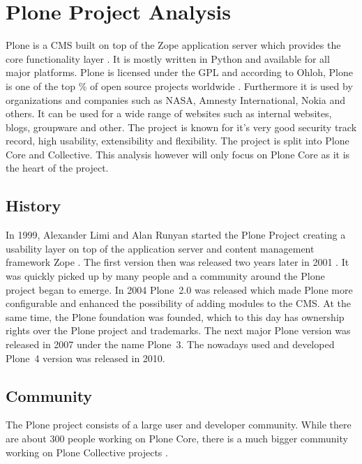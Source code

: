 \section{Plone Project Analysis} %


Plone is a \ac{CMS} built on top of the Zope application server which provides
the core functionality layer \cite{Aspeli2005,PloneFaq,PloneWhatIsPlone}. It is
mostly written in Python and available for all major platforms. Plone is
licensed under the \ac{GPL} and according to Ohloh, Plone is one of the top
\unit[2]{\%} of open source projects worldwide \cite{PloneOhlohFactoids}.
Furthermore it is used by organizations and companies such as NASA, Amnesty
International, Nokia and others. It can be used for a wide range of websites such
as internal websites, blogs, groupware and other. The project is known for it's
very good security track record, high usability, extensibility and flexibility.
The project is split into Plone Core and Collective. This analysis however will
only focus on Plone Core as it is the heart of the project.

\subsection{History} %

In 1999, Alexander Limi and Alan Runyan started the Plone Project creating a
usability layer on top of the application server and content management
framework Zope \cite{Aspeli2005,PloneFaq}. The first version then was released
two years later in 2001 \cite{PloneReleases}. It was quickly picked up by many
people and a community around the Plone project began to emerge. In 2004
Plone~2.0 was released which made Plone more configurable and enhanced the
possibility of adding modules to the \ac{CMS}. At the same time, the Plone
foundation was founded, which to this day has ownership rights over the Plone
project and trademarks. The next major Plone version was released in 2007 under
the name Plone~3. The nowadays used and developed Plone~4 version was released
in 2010.


\subsection{Community} %

The Plone project consists of a large user and developer community. While there
are about 300 people working on Plone Core, there is a much bigger community
working on Plone Collective projects
\cite{Aspeli2005,PloneOhlohFactoids,PloneCommunityProcesses}.

